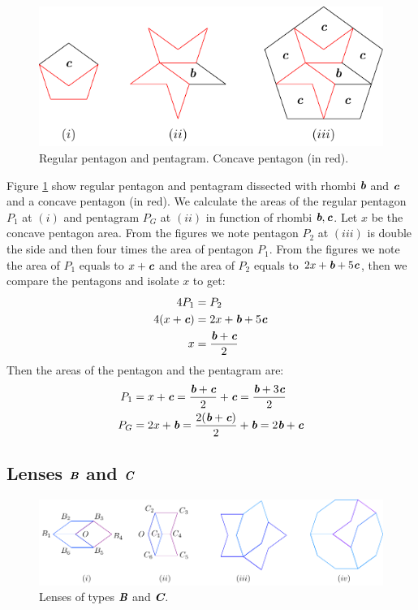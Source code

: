 \documentclass[11pt]{article}
\def\mathbi#1{\textbf{\em #1}}
\begin{document}
\begin{figure}[H]
\centering
\includegraphics[scale=1.1]{bc/penta}
\caption{Regular pentagon and pentagram. Concave pentagon (in red).}
\label{fig:bc-penta}
\end{figure}

Figure \ref{fig:bc-penta} show regular pentagon and pentagram dissected with rhombi $\mathbi{b}$ and $\mathbi{c}$ and a concave pentagon (in red). We calculate the areas of the regular pentagon $P_1$ at $(i)$ and pentagram $P_G$ at $(ii)$ in function of rhombi $\mathbi{b},\mathbi{c}$. Let $x$ be the concave pentagon area. From the figures we note pentagon $P_2$ at $(iii)$ is double the side and then four times the area of pentagon $P_1$. From the figures we note the area of $P_1$ equals to $x + \mathbi{c}$ and the area of $P_2$ equals to $2x + \mathbi{b} + 5\mathbi{c}$, then we compare the pentagons and isolate $x$ to get:
\begin{align}
4P_1 &= P_2 \nonumber\\
4(x + \mathbi{c}) &= 2x + \mathbi{b} + 5\mathbi{c} \nonumber\\
x &= \frac{\mathbi{b} + \mathbi{c}}2
\end{align}
Then the areas of the pentagon and the pentagram are:
\begin{align}
P_1 &= x + \mathbi{c} 
 = \frac{\mathbi{b} + \mathbi{c}}2 + \mathbi{c}
 = \frac{\mathbi{b} + 3\mathbi{c}}2 \\
P_G &= 2x + \mathbi{b}
 = \frac{2(\mathbi{b} + \mathbi{c})}2 + \mathbi{b}
 = 2\mathbi{b} + \mathbi{c}
\end{align}

\subsection{Lenses $\mathbi{B}$ and $\mathbi{C}$}

\begin{figure}[H]
\centering
\includegraphics[scale=1.1]{bc/hexagons}
\caption{Lenses of types $\mathbi{B}$ and $\mathbi{C}$.}
\label{fig:bc-hexagons}
\end{figure}
\end{document}
